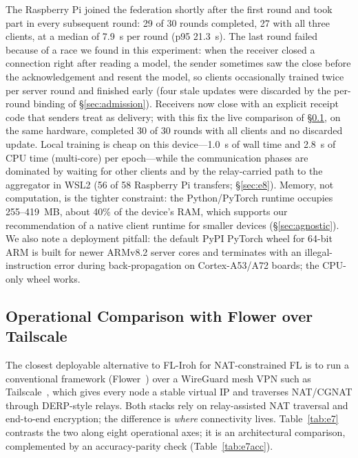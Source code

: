 \documentclass[a4paper,fleqn]{cas-dc}
\begin{document}
The Raspberry Pi joined the federation shortly after the first round and took part in every subsequent round: 29 of 30 rounds completed, 27 with all three clients, at a median of 7.9~s per round (p95 21.3~s). The last round failed because of a race we found in this experiment: when the receiver closed a connection right after reading a model, the sender sometimes saw the close before the acknowledgement and resent the model, so clients occasionally trained twice per server round and finished early (four stale updates were discarded by the per-round binding of \S\ref{sec:admission}). Receivers now close with an explicit receipt code that senders treat as delivery; with this fix the live comparison of \S\ref{sec:flower}, on the same hardware, completed 30 of 30 rounds with all clients and no discarded update. Local training is cheap on this device---1.0~s of wall time and 2.8~s of CPU time (multi-core) per epoch---while the communication phases are dominated by waiting for other clients and by the relay-carried path to the aggregator in WSL2 (56 of 58 Raspberry Pi transfers; \S\ref{sec:e8}). Memory, not computation, is the tighter constraint: the Python/PyTorch runtime occupies 255--419~MB, about 40\% of the device's RAM, which supports our recommendation of a native client runtime for smaller devices (\S\ref{sec:agnostic}). We also note a deployment pitfall: the default PyPI PyTorch wheel for 64-bit ARM is built for newer ARMv8.2 server cores and terminates with an illegal-instruction error during back-propagation on Cortex-A53/A72 boards; the CPU-only wheel works.

\subsection{Operational Comparison with Flower over Tailscale}
\label{sec:flower}


The closest deployable alternative to FL-Iroh for NAT-constrained FL is to run a conventional framework (Flower~\cite{flower2022}) over a WireGuard mesh VPN such as Tailscale~\cite{tailscale2023}, which gives every node a stable virtual IP and traverses NAT\slash CGNAT through DERP-style relays. Both stacks rely on relay-assisted NAT traversal and end-to-end encryption; the difference is \emph{where} connectivity lives. Table~\ref{tab:e7} contrasts the two along eight operational axes; it is an architectural comparison, complemented by an accuracy-parity check (Table~\ref{tab:e7acc}).
\end{document}
